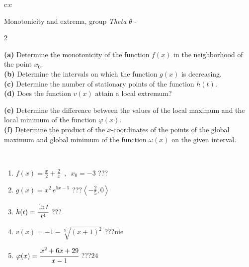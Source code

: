 \documentclass[10pt]{report}
\begin{document}
\begin{tabular}{c:c}
\begin{minipage}[c][104.5mm][t]{0.5\linewidth}
\begin{center}
\vspace{5mm}
{\huge Monotonicity and extrema, group \textit{Theta $\theta$} -}\\[5mm]
\begin{minipage}{0.95\linewidth}
\begin{center}
{\small \begin{multicols}{2} \raggedright
\textbf{(a)} Determine the monotonicity of the function \(f(x)\) in the neighborhood of the point \(x_0\). \\[1mm]
\textbf{(b)} Determine the intervals on which the function \(g(x)\) is decreasing. \\[1mm]
\textbf{(c)} Determine the number of stationary points of the function \(h(t)\). \\[1mm]
\textbf{(d)} Does the function \(v(x)\) attain a local extremum? \par \columnbreak
\textbf{(e)} Determine the difference between the values of the local maximum and the local minimum of the function \(\varphi(x)\). \\[1mm]
\textbf{(f)} Determine the product of the \(x\)-coordinates of the points of the global maximum and global minimum of the function \(\omega(x)\) on the given interval. \\[1mm]
\end{multicols}
}
\end{center}
\end{minipage}
\\[1mm]
\begin{minipage}{0.79\linewidth}
\begin{center}
\begin{varwidth}{\linewidth}
\setlength{\itemsep}{0pt}
\begin{enumerate}
\normalsize
\item $f(x)=\frac{x}{2}+\frac{2}{x} \enspace , \enspace x_0=-3$\quad \dotfill\; ???\;\dotfill \quad {}
\item $g(x)=x^2\, e^{5x-5}$\quad \dotfill\; ???\;\dotfill \quad $\left\langle-\frac{2}{5} , 0\right\rangle$
\item $h(t)=\cfrac{\ln t}{t^4}$\quad \dotfill\; ???\;\dotfill {}
\item $v(x)=-1-\sqrt[5]{(x+1)^2}$\quad \dotfill\; ???\;\dotfill \quad $\text{nie}$
\item $\varphi(x)=\cfrac{x^2+6x+29}{x-1}$\quad \dotfill\; ???\;\dotfill \quad $24$

\end{enumerate}
\end{varwidth}
\end{center}
\end{minipage}
\end{center}
\end{minipage}
\end{tabular}
\end{document}
